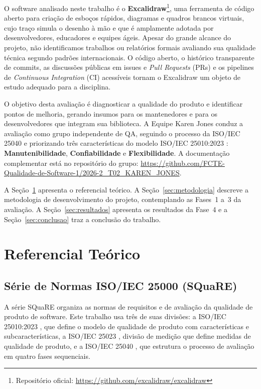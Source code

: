 \documentclass[12pt]{article}
\begin{document}
O software analisado neste trabalho é o \textbf{Excalidraw}\footnote{Repositório oficial: \url{https://github.com/excalidraw/excalidraw}}, uma ferramenta de código aberto para criação de esboços rápidos, diagramas e quadros brancos virtuais, cujo traço simula o desenho à mão e que é amplamente adotada por desenvolvedores, educadores e equipes ágeis. Apesar do grande alcance do projeto, não identificamos trabalhos ou relatórios formais avaliando sua qualidade técnica segundo padrões internacionais. O código aberto, o histórico transparente de commits, as discussões públicas em issues e \textit{Pull Requests} (PRs) e os pipelines de \textit{Continuous Integration} (CI) acessíveis tornam o Excalidraw um objeto de estudo adequado para a disciplina.

O objetivo desta avaliação é diagnosticar a qualidade do produto e identificar pontos de melhoria, gerando insumos para os mantenedores e para os desenvolvedores que integram sua biblioteca. A Equipe Karen Jones conduz a avaliação como grupo independente de QA, seguindo o processo da ISO/IEC 25040 \cite{iso25040} e priorizando três características do modelo ISO/IEC 25010:2023 \cite{iso25010}: \textbf{Manutenibilidade}, \textbf{Confiabilidade} e \textbf{Flexibilidade}. A documentação complementar está no repositório do grupo: \url{https://github.com/FCTE-Qualidade-de-Software-1/2026-2_T02_KAREN_JONES}.

A Seção~\ref{sec:referencial} apresenta o referencial teórico. A Seção~\ref{sec:metodologia} descreve a metodologia de desenvolvimento do projeto, contemplando as Fases~1 a~3 da avaliação. A Seção~\ref{sec:resultados} apresenta os resultados da Fase~4 e a Seção~\ref{sec:conclusao} traz a conclusão do trabalho.

\section{Referencial Teórico}
\label{sec:referencial}

\subsection{Série de Normas ISO/IEC 25000 (SQuaRE)}
\label{subsec:normas}

A série SQuaRE \cite{iso25000} organiza as normas de requisitos e de avaliação da qualidade de produto de software. Este trabalho usa três de suas divisões: a ISO/IEC 25010:2023 \cite{iso25010}, que define o modelo de qualidade de produto com características e subcaracterísticas, a ISO/IEC 25023 \cite{iso25023}, divisão de medição que define medidas de qualidade de produto, e a ISO/IEC 25040 \cite{iso25040}, que estrutura o processo de avaliação em quatro fases sequenciais.
\end{document}

